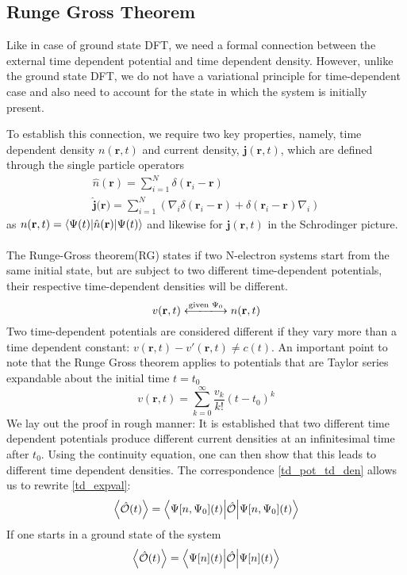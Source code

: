 \subsection{Runge Gross Theorem}
Like in case of ground state DFT, we need a formal connection between the external time dependent potential and time dependent density. However, unlike the ground state DFT, we do not have a variational principle for time-dependent case and also need to account for the state in which the system is initially present. 

To establish this connection, we require two key properties, namely, time dependent density $n(\mathbf{r},t)$ and current density, $\mathbf{j}(\mathbf{r},t)$, which are defined through the single particle operators
\begin{gather}
    \hat{n}(\mathbf{r}) = \sum_{i=1}^N \delta(\mathbf{r}_i-\mathbf{r}) \\ \hat{\mathbf{j}}(\mathbf{r)} = \sum_{i=1}^N\left(\nabla_i\delta(\mathbf{r}_i-\mathbf{r}) + \delta(\mathbf{r}_i-\mathbf{r})\nabla_i\right)
\end{gather}
as $n(\mathbf{r},t) = \ev**{\hat{n}(\mathbf{r})}{\Psi(t)}$ and likewise for $\mathbf{j}(\mathbf{r},t)$ in the Schrodinger picture. \\ \\ The Runge-Gross theorem(RG) states if two N-electron systems start from the same initial state, but are subject to two different time-dependent potentials, their respective time-dependent densities will be different. 
\begin{equation}\label{td_pot_td_den}
    v(\mathbf{r},t) \xlongleftrightarrow{\text{given } \Psi_0} n(\mathbf{r},t)
\end{equation}
Two time-dependent potentials are considered different if they vary more than a time dependent constant: $v(\mathbf{r},t) - v'(\mathbf{r},t) \neq c(t)$. An important point to note that the Runge Gross theorem applies to potentials that are Taylor series expandable about the initial time $t=t_0$
\begin{equation}
    v(\mathbf{r},t) = \sum_{k=0}^\infty \frac{v_k}{k!}(t-t_0)^k 
\end{equation}
We lay out the proof in rough manner: It is established that two different time dependent potentials produce different current densities at an infinitesimal time after $t_0$. Using the continuity equation, one can then show that this leads to different time dependent densities. 
The correspondence \eqref{td_pot_td_den} allows us to rewrite \eqref{td_expval}:
\begin{equation}
    \expval{\hat{\mathcal{O}}(t)} = \ev**{\hat{\mathcal{O}}}{\Psi[n,\Psi_0](t)}
\end{equation}
If one starts in a ground state of the system
\begin{equation}
    \expval{\hat{\mathcal{O}}(t)} = \ev**{\hat{\mathcal{O}}}{\Psi[n](t)}
\end{equation}
